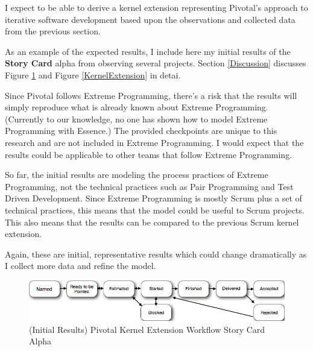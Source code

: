 \documentclass[preprint,12pt,3p]{elsarticle}
\begin{document}
I expect to be able to derive a kernel extension representing Pivotal's approach to iterative software development based upon the  observations and collected data from the previous section.

As an example of the expected results, I include here my initial results of the \textbf{Story Card} alpha from observing several projects. Section \ref{Discussion} discusses Figure \ref{KernelExtensionWorkflow} and Figure \ref{KernelExtension} in detai.

Since Pivotal follows Extreme Programming, there's a risk that the results will simply reproduce what is already known about Extreme Programming. (Currently to our knowledge, no one has shown how to model Extreme Programming with Essence.) The provided checkpoints are unique to this research and are not included in Extreme Programming. I would expect that the results could be applicable to other teams that follow Extreme Programming. 

So far, the initial results are modeling the process practices of Extreme Programming, not the technical practices such as Pair Programming and Test Driven Development. Since Extreme Programming is mostly Scrum plus a set of technical practices, this means that the model could be useful to Scrum projects. This also means that the results can be compared to the previous Scrum kernel extension.

Again, these are initial, representative results which could change dramatically as I collect more data and refine the model.

\begin{figure}[ht]
\includegraphics[width=6.25in]{pivotal_images/story_card_workflow}
\caption{(Initial Results) Pivotal Kernel Extension Workflow Story Card Alpha}
\label{KernelExtensionWorkflow}
\end{figure}
\end{document}
